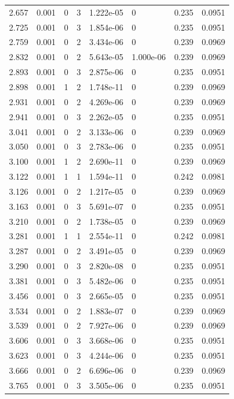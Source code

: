 \documentclass[preview]{standalone}
\begin{document}
{{{\begin{tabular}{L{1.2cm}C{1.2cm} C{0.3cm}C{0.5cm} C{1.4cm}C{1.4cm} C{1.4cm}C{1.4cm}}
  2.657  &  0.001  & 0     &  3 &  1.222e-05  & 0  & 0.235 &  0.0951   \\ 
  2.725  &  0.001  & 0     &  3 &  1.854e-06  & 0  & 0.235 &  0.0951   \\ 
  2.759  &  0.001  & 0     &  2 &  3.434e-06  & 0  & 0.239 &  0.0969   \\ 
  2.832  &  0.001  & 0     &  2 &  5.643e-05  & 1.000e-06  & 0.239 &  0.0969   \\ 
  2.893  &  0.001  & 0     &  3 &  2.875e-06  & 0  & 0.235 &  0.0951   \\ 
  2.898  &  0.001  & 1     &  2 &  1.748e-11  & 0  & 0.239 &  0.0969   \\ 
  2.931  &  0.001  & 0     &  2 &  4.269e-06  & 0  & 0.239 &  0.0969   \\ 
  2.941  &  0.001  & 0     &  3 &  2.262e-05  & 0  & 0.235 &  0.0951   \\ 
  3.041  &  0.001  & 0     &  2 &  3.133e-06  & 0  & 0.239 &  0.0969   \\ 
  3.050  &  0.001  & 0     &  3 &  2.783e-06  & 0  & 0.235 &  0.0951   \\ 
  3.100  &  0.001  & 1     &  2 &  2.690e-11  & 0  & 0.239 &  0.0969   \\ 
  3.122  &  0.001  & 1     &  1 &  1.594e-11  & 0  & 0.242 &  0.0981   \\ 
  3.126  &  0.001  & 0     &  2 &  1.217e-05  & 0  & 0.239 &  0.0969   \\ 
  3.163  &  0.001  & 0     &  3 &  5.691e-07  & 0  & 0.235 &  0.0951   \\ 
  3.210  &  0.001  & 0     &  2 &  1.738e-05  & 0  & 0.239 &  0.0969   \\ 
  3.281  &  0.001  & 1     &  1 &  2.554e-11  & 0  & 0.242 &  0.0981   \\ 
  3.287  &  0.001  & 0     &  2 &  3.491e-05  & 0  & 0.239 &  0.0969   \\ 
  3.290  &  0.001  & 0     &  3 &  2.820e-08  & 0  & 0.235 &  0.0951   \\ 
  3.381  &  0.001  & 0     &  3 &  5.482e-06  & 0  & 0.235 &  0.0951   \\ 
  3.456  &  0.001  & 0     &  3 &  2.665e-05  & 0  & 0.235 &  0.0951   \\ 
  3.534  &  0.001  & 0     &  2 &  1.883e-07  & 0  & 0.239 &  0.0969   \\ 
  3.539  &  0.001  & 0     &  2 &  7.927e-06  & 0  & 0.239 &  0.0969   \\ 
  3.606  &  0.001  & 0     &  3 &  3.668e-06  & 0  & 0.235 &  0.0951   \\ 
  3.623  &  0.001  & 0     &  3 &  4.244e-06  & 0  & 0.235 &  0.0951   \\ 
  3.666  &  0.001  & 0     &  2 &  6.696e-06  & 0  & 0.239 &  0.0969   \\ 
  3.765  &  0.001  & 0     &  3 &  3.505e-06  & 0  & 0.235 &  0.0951   \\ 
\hline 
\end{tabular} 

}}}
\end{document}
